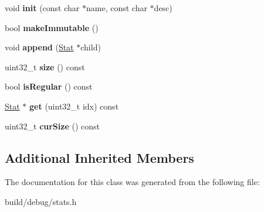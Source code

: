 \begin{DoxyCompactItemize}
\item 
\hypertarget{classAggregateStat_a5a872e7b0af5362eaae6b304fef84238}{void {\bfseries init} (const char $\ast$name, const char $\ast$desc)}\label{classAggregateStat_a5a872e7b0af5362eaae6b304fef84238}

\item 
\hypertarget{classAggregateStat_ab2265e46065d4664f3f4507a8c3691b1}{bool {\bfseries make\-Immutable} ()}\label{classAggregateStat_ab2265e46065d4664f3f4507a8c3691b1}

\item 
\hypertarget{classAggregateStat_af4f3bbb6a336b481299b936ddcced4cb}{void {\bfseries append} (\hyperlink{classStat}{Stat} $\ast$child)}\label{classAggregateStat_af4f3bbb6a336b481299b936ddcced4cb}

\item 
\hypertarget{classAggregateStat_a20e9df9e5246b41edd111b5088118d8a}{uint32\-\_\-t {\bfseries size} () const }\label{classAggregateStat_a20e9df9e5246b41edd111b5088118d8a}

\item 
\hypertarget{classAggregateStat_a0ecf5b1c93991c7d5c5cc4fa2c07287c}{bool {\bfseries is\-Regular} () const }\label{classAggregateStat_a0ecf5b1c93991c7d5c5cc4fa2c07287c}

\item 
\hypertarget{classAggregateStat_a52c0cebe85e6e2f147329a3f3ad771a7}{\hyperlink{classStat}{Stat} $\ast$ {\bfseries get} (uint32\-\_\-t idx) const }\label{classAggregateStat_a52c0cebe85e6e2f147329a3f3ad771a7}

\item 
\hypertarget{classAggregateStat_a79cb6a42f80d59c331cba872eff8d6ff}{uint32\-\_\-t {\bfseries cur\-Size} () const }\label{classAggregateStat_a79cb6a42f80d59c331cba872eff8d6ff}

\end{DoxyCompactItemize}
\subsection*{Additional Inherited Members}


The documentation for this class was generated from the following file\-:\begin{DoxyCompactItemize}
\item 
build/debug/stats.\-h\end{DoxyCompactItemize}
